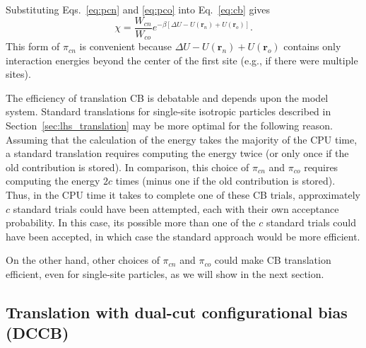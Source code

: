 Substituting Eqs.~\ref{eq:pcn} and \ref{eq:pco} into Eq.~\ref{eq:cb} gives
\begin{equation}
\chi = \frac{W_{cn}}{W_{co}}e^{-\beta[\Delta U - U(\mathbf{r}_n) + U(\mathbf{r}_o)]}.
\end{equation}
This form of $\pi_{cn}$ is convenient because $\Delta U - U(\mathbf{r}_n) + U(\mathbf{r}_o)$ contains only interaction energies beyond the center of the first site (e.g., if there were multiple sites).

The efficiency of translation CB is debatable and depends upon the model system.
Standard translations for single-site isotropic particles described in Section~\ref{sec:lhs_translation} may be more optimal for the following reason.
Assuming that the calculation of the energy takes the majority of the CPU time, a standard translation requires computing the energy twice (or only once if the old contribution is stored).
In comparison, this choice of $\pi_{cn}$ and $\pi_{co}$ requires computing the energy $2c$ times (minus one if the old contribution is stored).
Thus, in the CPU time it takes to complete one of these CB trials, approximately $c$ standard trials could have been attempted, each with their own acceptance probability.
In this case, its possible more than one of the $c$ standard trials could have been accepted, in which case the standard approach would be more efficient.

On the other hand, other choices of $\pi_{cn}$ and $\pi_{co}$ could make CB translation efficient, even for single-site particles, as we will show in the next section.

\subsection{\label{sec:lhs_disp_dccb}Translation with dual-cut configurational bias (DCCB)}

